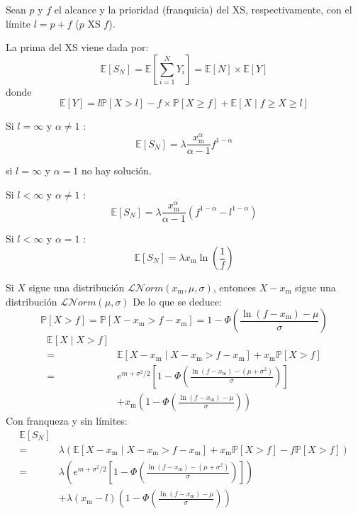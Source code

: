 \begin{f}
	Sean \(p\) y \(f\) el alcance y la prioridad (franquicia) del XS, respectivamente, con el límite \(l=p+f\) (\(p\) XS \(f\)).
	
	La prima del XS viene dada por:
\[
\mathbb{E}\left[S_N\right]=\mathbb{E}\left[\sum_{i=1}^{N} Y_{i}\right]=\mathbb{E}[N]\times \mathbb{E}[Y]
\]
donde
\[
\mathbb{E}[Y]= l \mathbb{P}[X>l] - f \times \mathbb{P}[X\geq f] + \mathbb{E}[X\mid f\geq X\geq l]
\]


Si \(l=\infty\) y \(\alpha \neq 1\) :
\[
\mathbb{E}[S_N] = \lambda \frac{x_\mathrm{m}^{\alpha}}{\alpha -1}f^{1-\alpha} 
\]

si  \(l=\infty\) y \(\alpha = 1\) no hay solución.

Si \(l<\infty\) y \(\alpha \neq 1\) :
\[
\mathbb{E}[S_N] = \lambda \frac{x_\mathrm{m}^{\alpha}}{\alpha -1}\left( f^{1-\alpha} -l^{1-\alpha} \right)
\]

Si \(l<\infty\) y \(\alpha = 1\) :
\[
\mathbb{E}[S_N] = \lambda x_\mathrm{m} \ln \left(  \frac{1}{f}\right)
\]
\end{f}



\begin{f}

Si \(X\) sigue una distribución \(\mathcal{L}\mathcal{N}orm(x_\mathrm{m}, \mu, \sigma)\), entonces \(X-x_\mathrm{m}\) sigue una distribución \(\mathcal{L}\mathcal{N}orm(\mu, \sigma)\)
De lo que se deduce:
\[
\mathbb{P}[X>f]=\mathbb{P}[X-x_\mathrm{m}>f-x_\mathrm{m}]=1-\Phi\left(\frac{\ln(f-x_\mathrm{m})-\mu}{\sigma}\right)
\]
\begin{align*}
	\mathbb{E}[X\mid X>f] \\ 
	= & \mathbb{E}\left[ X-x_\mathrm{m}\mid X-x_\mathrm{m}>f-x_\mathrm{m} \right]+x_\mathrm{m} \mathbb{P}[X>f]\\
	= & e ^{m+\sigma^2/2} \left[1-\Phi\left(\frac{\ln(f-x_\mathrm{m})-(\mu+\sigma^2)}{\sigma}\right) \right]\\
	& +x_\mathrm{m} \left( 1-\Phi\left(\frac{\ln(f-x_\mathrm{m})-\mu}{\sigma}\right) \right)
\end{align*}
Con franqueza y sin límites:
\begin{align*}
	\mathbb{E}[S_N] \\ 
	= & \lambda \left(\mathbb{E}\left[ X-x_\mathrm{m}\mid X-x_\mathrm{m}>f-x_\mathrm{m} \right]+x_\mathrm{m} \mathbb{P}[X>f]-f\mathbb{P}[X>f]\right)\\
	= & \lambda \left(  e ^{m+\sigma^2/2} \left[1-\Phi\left(\frac{\ln(f-x_\mathrm{m})-(\mu+\sigma^2)}{\sigma}\right) \right]\right)\\
	& +\lambda (x_\mathrm{m}-l) \left( 1-\Phi\left(\frac{\ln(f-x_\mathrm{m})-\mu}{\sigma}\right) \right)
\end{align*}

\end{f}